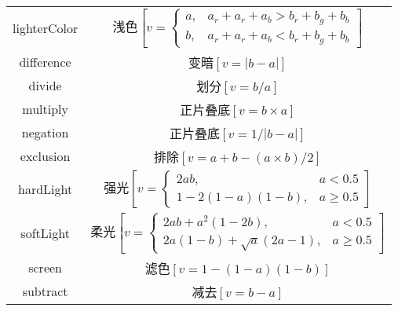 \begin{longtable}{cc}
lighterColor
    &
浅色$\left[v=\begin{cases}
a, & a_r+a_r+a_b>b_r+b_g+b_b \\ 
b, & a_r+a_r+a_b<b_r+b_g+b_b
\end{cases}\right]$
    \\

difference
    &
变暗$\left[v=\left|b-a\right|\right]$
    \\

divide
    &
划分$\left[v=b/a\right]$
    \\

multiply
    &
正片叠底$\left[v=b\times{}a\right]$
    \\

negation
    &
正片叠底$\left[v=1/\left|b-a\right|\right]$
    \\

exclusion
    &
排除$\left[v=a+b-(a\times{}b)/2\right]$
    \\

hardLight
    &
强光$\left[v=\begin{cases}
2ab, & a<0.5 \\ 
1-2(1-a)(1-b), & a\ge{}0.5
\end{cases}\right]$
    \\

softLight
    &
柔光$\left[v=\begin{cases}
2ab+a^2(1-2b), & a<0.5 \\ 
2a(1-b)+\sqrt{a}(2a-1), & a\ge{}0.5
\end{cases}\right]$
    \\

screen
    &
滤色$\left[v=1-(1-a)(1-b)\right]$
    \\

subtract
    &
减去$\left[v=b-a\right]$
    \\
\end{longtable}








